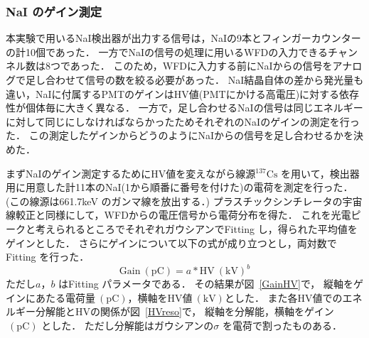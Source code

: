 \subsubsection{NaI のゲイン測定}
本実験で用いるNaI検出器が出力する信号は，NaIの9本とフィンガーカウンターの計10個であった．
一方でNaIの信号の処理に用いるWFDの入力できるチャンネル数は8つであった．
このため，WFDに入力する前にNaIからの信号をアナログで足し合わせて信号の数を絞る必要があった．
NaI結晶自体の差から発光量も違い，NaIに付属するPMTのゲインはHV値(PMTにかける高電圧)に対する依存性が個体毎に大きく異なる．
一方で，足し合わせるNaIの信号は同じエネルギーに対して同じにしなければならかったためそれぞれのNaIのゲインの測定を行った．
この測定したゲインからどうのようにNaIからの信号を足し合わせるかを決めた．

まずNaIのゲイン測定するためにHV値を変えながら線源$^{137}\mathrm{Cs}$ を用いて，検出器用に用意した計11本のNaI(1から順番に番号を付けた)の電荷を測定を行った．
(この線源は661.7keV のガンマ線を放出する．\cite{IAEA_ENSDF})
プラスチックシンチレータの宇宙線較正と同様にして，WFDからの電圧信号から電荷分布を得た．
これを光電ピークと考えられるところでそれぞれガウシアンでFitting し，得られた平均値をゲインとした．
さらにゲインについて以下の式が成り立つとし，両対数でFitting を行った．\cite{Hamamatsu_PMT}
\begin{equation}
\mathrm{Gain}~(\mathrm{pC})=a*\mathrm{HV}~(\mathrm{kV})^b \label{gain_curve}  
\end{equation}
ただし$a， b$ はFitting パラメータである．
その結果が図~\ref{GainHV}で，
縦軸をゲインにあたる電荷量$~(\mathrm{pC})$，横軸をHV値$~(\mathrm{kV})$とした．
また各HV値でのエネルギー分解能とHVの関係が図~\ref{HVreso}で，
縦軸を分解能，横軸をゲイン$~(\mathrm{pC})$ とした．
ただし分解能はガウシアンの$\sigma$ を電荷で割ったものある．
